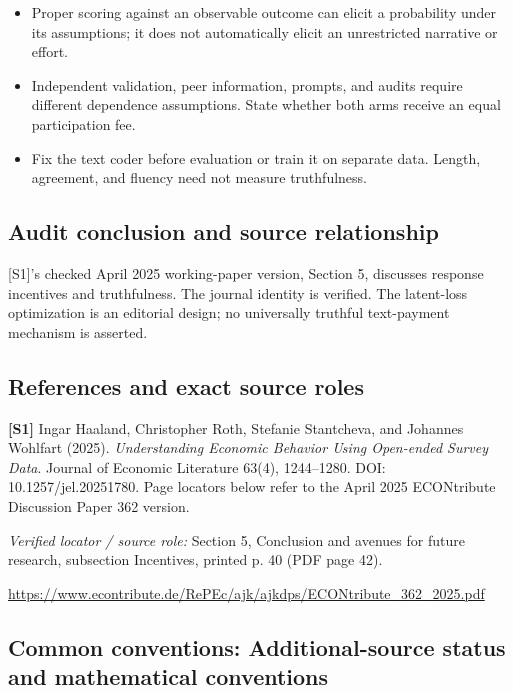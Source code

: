 \documentclass[11pt,a4paper]{article}
\begin{document}
\begin{itemize}
\item Proper scoring against an observable outcome can elicit a probability under its assumptions; it does not automatically elicit an unrestricted narrative or effort.
\item Independent validation, peer information, prompts, and audits require different dependence assumptions. State whether both arms receive an equal participation fee.
\item Fix the text coder before evaluation or train it on separate data. Length, agreement, and fluency need not measure truthfulness.
\end{itemize}

\subsection*{Audit conclusion and source relationship}

[S1]'s checked April 2025 working-paper version, Section 5, discusses response incentives and truthfulness. The journal identity is verified. The latent-loss optimization is an editorial design; no universally truthful text-payment mechanism is asserted.

\subsection*{References and exact source roles}

{\footnotesize\raggedright
\par\noindent\textbf{[S1]} Ingar Haaland, Christopher Roth, Stefanie Stantcheva, and Johannes Wohlfart (2025). \emph{Understanding Economic Behavior Using Open-ended Survey Data}. Journal of Economic Literature 63(4), 1244–1280. DOI: 10.1257/jel.20251780. Page locators below refer to the April 2025 ECONtribute Discussion Paper 362 version.\par \textit{Verified locator / source role:} Section 5, Conclusion and avenues for future research, subsection Incentives, printed p. 40 (PDF page 42).\par \url{https://www.econtribute.de/RePEc/ajk/ajkdps/ECONtribute_362_2025.pdf}\par\smallskip
}

\subsection*{Common conventions: Additional-source status and mathematical conventions}
\end{document}
